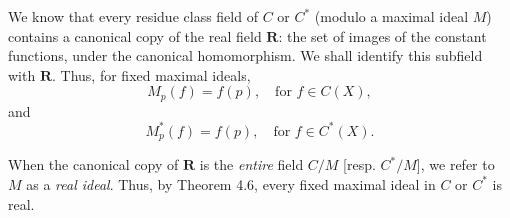 We know that every residue class field of $C$ or $C^*$ (modulo a maximal ideal $M$) contains a canonical copy of the real field $\mathbf{R}$: the set of images of the constant functions, under the canonical homomorphism. We shall identify this subfield with $\mathbf{R}$. Thus, for fixed maximal ideals,
$$
M_p(f) = f(p), \quad \text{for } f \in C(X),
$$
and
$$
M^*_p(f) = f(p), \quad \text{for } f \in C^*(X).
$$

When the canonical copy of $\mathbf{R}$ is the \emph{entire} field $C/M$ [resp. $C^*/M$], we refer to $M$ as a \emph{real ideal}. Thus, by Theorem 4.6, every fixed maximal ideal in $C$ or $C^*$ is real.
